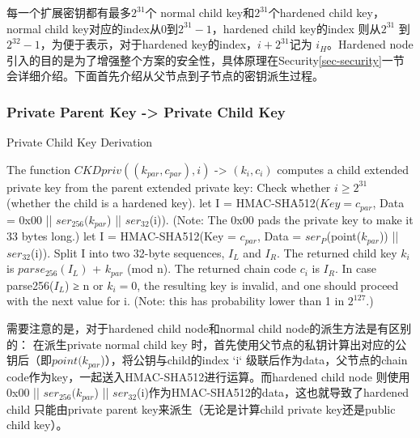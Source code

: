  每一个扩展密钥都有最多$2^{31}$个 normal child key和$2^{31}$个hardened child key， normal child key对应的index从0到$2^{31}-1$，hardened child key的index 则从$2^{31}$ 到$2^{32}-1$，为便于表示，对于hardened key的index，$i+2^{31}$记为 $i_H$。Hardened node引入的目的是为了增强整个方案的安全性，具体原理在Security\ref{sec-security}一节会详细介绍。下面首先介绍从父节点到子节点的密钥派生过程。

\subsubsection{Private Parent Key -> Private Child Key}
 
\begin{algorithm}[tbp]\footnotesize
\caption{Private Child Key Derivation}
  	\begin{algorithmic}[1]
	    \STATE The function $CKDpriv((k_{par}, c_{par}), i)$ -> $(k
		_i, c_i)$ computes a child extended private key from the parent extended private key:
		\STATE Check whether $i ≥ 2^{31}$ (whether the child is a hardened key).  
			\STATE let I = HMAC-SHA512($Key = c_{par}$, Data = 0x00 || $ser_{256}(k_{par}$) || $ser_{32}$(i)). (Note: The 0x00 pads the private key to make it 33 bytes long.)  
		\ELSE
			\STATE let I = HMAC-SHA512(Key = $c_{par}$, Data = $ser_P$(point($k_{par}$)) || $ser_{32}$(i)).  
		\ENDIF
		\STATE Split I into two 32-byte sequences, $I_L$ and $I_R$.
		\STATE The returned child key $k_i$ is $parse_{256}(I_L)$ + $k_{par}$ (mod n).
		\STATE The returned chain code $c_i$ is $I_R$.  
		\STATE In case parse256($I_L$) ≥ n or $k_i = 0$, the resulting key is invalid, and one should proceed with the next value for i. (Note: this has probability lower than 1 in $2^{127}$.)  
    \end{algorithmic}
\end{algorithm}

需要注意的是，对于hardened child node和normal child node的派生方法是有区别的：
在派生private normal child key 时，首先使用父节点的私钥计算出对应的公钥后（即$point(k_{par}$)），将公钥与child的index `i` 级联后作为data，父节点的chain code作为key，一起送入HMAC-SHA512进行运算。而hardened child node 则使用0x00 || $ser_{256}(k_{par}$) || $ser_{32}$(i)作为HMAC-SHA512的data，这也就导致了hardened child 只能由private parent key来派生（无论是计算child private key还是public child key）。
 
